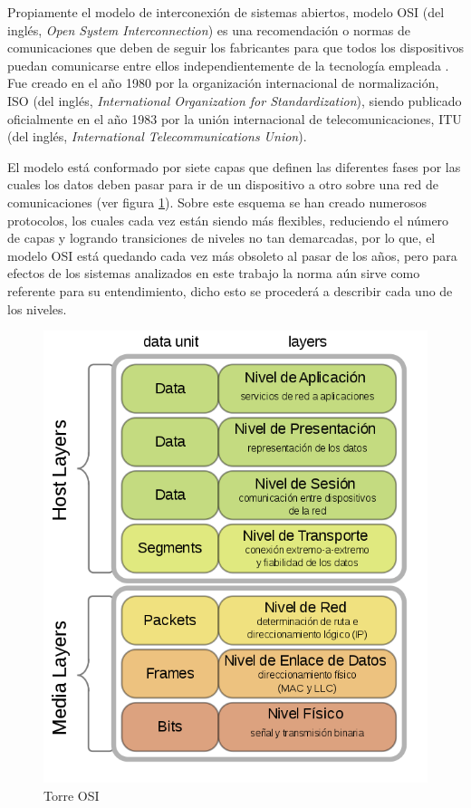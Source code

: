 \par Propiamente el modelo de interconexión de sistemas abiertos, modelo OSI (del inglés, \textit{Open System Interconnection}) es una recomendación o normas de comunicaciones que deben de seguir los fabricantes para que todos los dispositivos puedan comunicarse entre ellos independientemente de la tecnología empleada \cite{anaya2016sistema}. Fue creado en el año 1980 por la organización internacional de normalización, ISO (del inglés, \textit{International Organization for Standardization}), siendo publicado oficialmente en el año 1983 por la unión internacional de telecomunicaciones, ITU (del inglés, \textit{International Telecommunications Union}).\\

\par El modelo está conformado por siete capas que definen las diferentes fases por las cuales los datos deben pasar para ir de un dispositivo a otro sobre una red de comunicaciones (ver figura \ref{fig:osi}). Sobre este esquema se han creado numerosos protocolos, los cuales cada vez están siendo más flexibles, reduciendo el número de capas y logrando transiciones de niveles no tan demarcadas, por lo que, el modelo OSI está quedando cada vez más obsoleto al pasar de los años, pero para efectos de los sistemas analizados en este trabajo la norma aún sirve como referente para su entendimiento, dicho esto se procederá a describir cada uno de los niveles.\\

\begin{figure}[hbp]
	\centering
		\includegraphics[scale=0.4]{Imagenes/osi}
		\caption{Torre OSI \cite{anaya2016sistema}}
		\label{fig:osi}
	\end{figure}	


